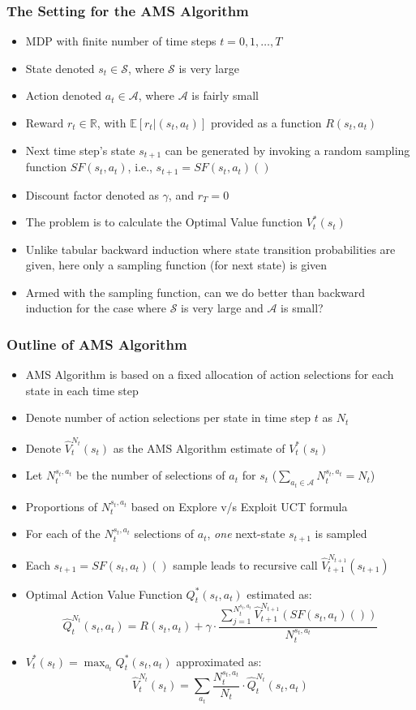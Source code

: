 \documentclass[handout]{beamer}
\begin{document}
\begin{frame}
\frametitle{The Setting for the AMS Algorithm}
\pause
\begin{itemize}[<+->]
\item MDP with finite number of time steps $t=0, 1, \ldots, T$
\item State denoted $s_t \in \mathcal{S}$, where $\mathcal{S}$ is very large
\item Action denoted $a_t \in \mathcal{A}$, where $\mathcal{A}$ is fairly small
\item Reward $r_t \in \mathbb{R}$, with $\mathbb{E}[r_t|(s_t, a_t)]$ provided as a function $R(s_t,a_t)$
\item Next time step's state $s_{t+1}$ can be generated by invoking a random sampling function $SF(s_t,a_t)$, i.e., $s_{t+1} = SF(s_t, a_t)()$
\item Discount factor denoted as $\gamma$, and $r_T = 0$
\item The problem is to calculate the Optimal Value function $V_t^*(s_t)$
\item Unlike tabular backward induction where state transition probabilities are given, here only a sampling function (for next state) is given
\item Armed with the sampling function, can we do better than backward induction for the case where $\mathcal{S}$ is very large and $\mathcal{A}$ is small?
\end{itemize}
\end{frame}

\begin{frame}
\frametitle{Outline of AMS Algorithm}
\pause
\begin{itemize}[<+->]
\item AMS Algorithm is based on a fixed allocation of action selections for each state in each time step
\item Denote number of action selections per state in time step $t$ as $N_t$
\item Denote $\hat{V}_t^{N_t}(s_t)$ as the AMS Algorithm estimate of $V_t^*(s_t)$
\item Let $N_t^{s_t,a_t}$ be the number of selections of $a_t$ for $s_t$ ($\sum_{a_t \in \mathcal{A}} N_t^{s_t,a_t} = N_t$)
\item Proportions of $N_t^{s_t,a_t}$ based on {Explore v/s Exploit} UCT formula
\item For each of the $N_t^{s_t,a_t}$ selections of $a_t$, {\em one} next-state $s_{t+1}$ is sampled
\item Each $s_{t+1} = SF(s_t,a_t)()$ sample leads to recursive call $\hat{V}_{t+1}^{N_{t+1}}(s_{t+1})$
\item Optimal Action Value Function $Q_t^*(s_t, a_t)$ estimated as:
$$\hat{Q}_t^{N_t}(s_t,a_t) = R(s_t,a_t) + \gamma \cdot \frac {\sum_{j=1}^{N_t^{s_t,a_t}} \hat{V}_{t+1}^{N_{t+1}}(SF(s_t,a_t)())} {N_t^{s_t,a_t}}$$
\item $V_t^*(s_t) = \max_{a_t} Q_t^*(s_t,a_t)$ approximated as:
$$\hat{V}_t^{N_t}(s_t) = \sum_{a_t} \frac {N_t^{s_t,a_t}} {N_t} \cdot \hat{Q}_t^{N_t}(s_t,a_t)$$
\end{itemize}
\end{frame}
\end{document}
